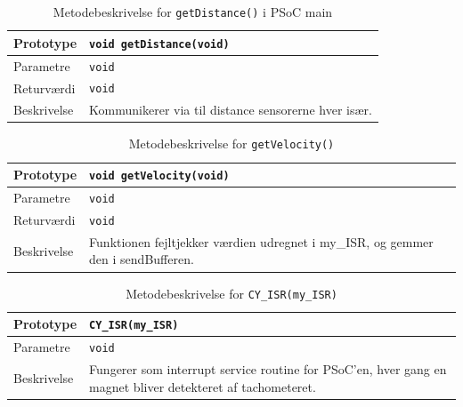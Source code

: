 \begin{table}[h]
	\begin{tabularx}{\textwidth}{| L{2.5 cm} | Z |} \hline
	Prototype 	& \texttt{void getDistance(void)} 	\\\hline
	Parametre 	& \texttt{void} 					\newline \\\hline
	Returværdi	& \texttt{void} 					\newline \\\hline
	Beskrivelse	& Kommunikerer via \IIC til distance sensorerne hver især.  \\\hline
	\end{tabularx}
	\caption{Metodebeskrivelse for \texttt{getDistance()} i PSoC main}
	\label{table:psoc_getdistance}
\end{table}

\clearpage

\begin{table}[h]
	\begin{tabularx}{\textwidth}{| L{2.5 cm} | Z |} \hline
	Prototype 	& \texttt{void getVelocity(void)} 	\\\hline
	Parametre 	& \texttt{void}						\newline \\\hline
	Returværdi	& \texttt{void} 					\newline \\\hline
	Beskrivelse	& Funktionen fejltjekker værdien udregnet i my\_ISR, og gemmer den i sendBufferen. \newline \\\hline
	\end{tabularx}
	\caption{Metodebeskrivelse for \texttt{getVelocity()}}
	\label{table:psoc_getvelocity}
\end{table}

\begin{table}[h]
	\begin{tabularx}{\textwidth}{| L{2.5 cm} | Z |} \hline
	Prototype 	& \texttt{CY\_ISR(my\_ISR)} 		\\\hline
	Parametre 	& \texttt{void}						\newline \\\hline
	Beskrivelse	& Fungerer som interrupt service routine for PSoC'en, hver gang en magnet bliver detekteret af tachometeret.\newline \\\hline
	\end{tabularx}
	\caption{Metodebeskrivelse for \texttt{CY\_ISR(my\_ISR)}}
	\label{table:psoc_my_isr}
\end{table}

